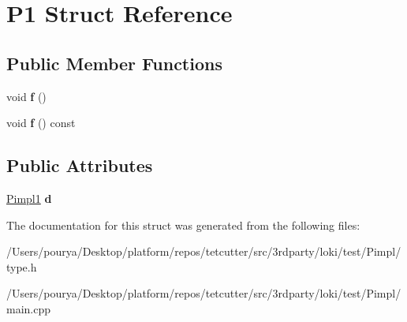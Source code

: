 \hypertarget{structP1}{}\section{P1 Struct Reference}
\label{structP1}
\subsection*{Public Member Functions}
\begin{DoxyCompactItemize}
\item 
\hypertarget{structP1_a5095c4aaac430b29f1c2437009649b40}{}void {\bfseries f} ()\label{structP1_a5095c4aaac430b29f1c2437009649b40}

\item 
\hypertarget{structP1_a225cb593c37e2fc8c7111501d5fc6653}{}void {\bfseries f} () const \label{structP1_a225cb593c37e2fc8c7111501d5fc6653}

\end{DoxyCompactItemize}
\subsection*{Public Attributes}
\begin{DoxyCompactItemize}
\item 
\hypertarget{structP1_a638bee7da80f4ebc1cb784fa06f6743e}{}\hyperlink{classLoki_1_1Pimpl}{Pimpl1} {\bfseries d}\label{structP1_a638bee7da80f4ebc1cb784fa06f6743e}

\end{DoxyCompactItemize}


The documentation for this struct was generated from the following files\+:\begin{DoxyCompactItemize}
\item 
/\+Users/pourya/\+Desktop/platform/repos/tetcutter/src/3rdparty/loki/test/\+Pimpl/type.\+h\item 
/\+Users/pourya/\+Desktop/platform/repos/tetcutter/src/3rdparty/loki/test/\+Pimpl/main.\+cpp\end{DoxyCompactItemize}
